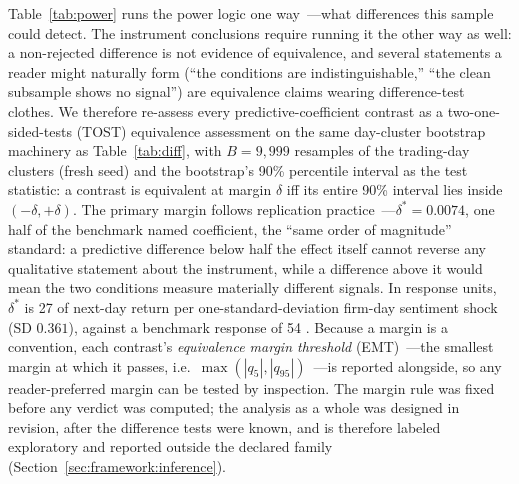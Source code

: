 Table~\ref{tab:power} runs the power logic one way~---what differences this sample could detect. The instrument conclusions require running it the other way as well: a non-rejected difference is not evidence of equivalence, and several statements a reader might naturally form (``the conditions are indistinguishable,'' ``the clean subsample shows no signal'') are equivalence claims wearing difference-test clothes. We therefore re-assess every predictive-coefficient contrast as a two-one-sided-tests (TOST) equivalence assessment on the same day-cluster bootstrap machinery as Table~\ref{tab:diff}, with $B=9{,}999$ resamples of the trading-day clusters (fresh seed) and the bootstrap's 90\% percentile interval as the test statistic: a contrast is equivalent at margin $\delta$ iff its entire 90\% interval lies inside $(-\delta, +\delta)$. The primary margin follows replication practice~---$\delta^{*}=0.0074$, one half of the benchmark named coefficient, the ``same order of magnitude'' standard: a predictive difference below half the effect itself cannot reverse any qualitative statement about the instrument, while a difference above it would mean the two conditions measure materially different signals. In response units, $\delta^{*}$ is 27 \bps{} of next-day return per one-standard-deviation firm-day sentiment shock (SD $0.361$), against a benchmark response of 54 \bps{}. Because a margin is a convention, each contrast's \emph{equivalence margin threshold} (EMT)~---the smallest margin at which it passes, i.e.\ $\max(|q_{5}|,|q_{95}|)$~---is reported alongside, so any reader-preferred margin can be tested by inspection. The margin rule was fixed before any verdict was computed; the analysis as a whole was designed in revision, after the difference tests were known, and is therefore labeled exploratory and reported outside the declared family (Section~\ref{sec:framework:inference}).

